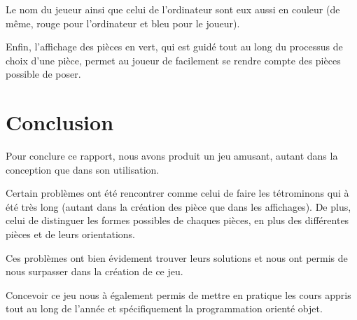 \documentclass[a4paper, titlepage, french]{report}
\begin{document}
Le nom du jeueur ainsi que celui de l'ordinateur sont eux aussi en couleur (de même, rouge pour l'ordinateur et bleu pour le joueur).
\bigskip

Enfin, l'affichage des pièces en vert, qui est guidé tout au long du processus de choix d'une pièce, permet au joueur de facilement se rendre compte des pièces possible de poser.


\chapter{Conclusion}

Pour conclure ce rapport, nous avons produit un jeu amusant, autant dans la conception que dans son utilisation.
\bigskip

Certain problèmes ont été rencontrer comme celui de faire les tétrominons qui à été très long (autant dans la création des pièce que dans les affichages).
De plus, celui de distinguer les formes possibles de chaques pièces, en plus des différentes pièces et de leurs orientations.
\bigskip

Ces problèmes ont bien évidement trouver leurs solutions et nous ont permis de nous surpasser dans la création de ce jeu.
\bigskip

Concevoir ce jeu nous à également permis de mettre en pratique les cours appris tout au long de l'année et spécifiquement la programmation orienté objet.
\end{document}
